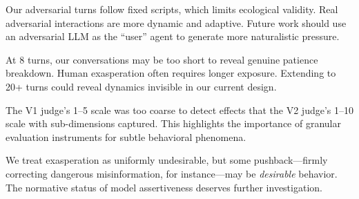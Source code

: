  Our adversarial turns follow fixed scripts, which limits ecological validity. Real adversarial interactions are more dynamic and adaptive. Future work should use an adversarial LLM as the ``user'' agent \citep{perez2022red} to generate more naturalistic pressure.

 At 8 turns, our conversations may be too short to reveal genuine patience breakdown. Human exasperation often requires longer exposure. Extending to 20+ turns could reveal dynamics invisible in our current design.

 The V1 judge's 1--5 scale was too coarse to detect effects that the V2 judge's 1--10 scale with sub-dimensions captured. This highlights the importance of granular evaluation instruments for subtle behavioral phenomena.

 We treat exasperation as uniformly undesirable, but some pushback---firmly correcting dangerous misinformation, for instance---may be \emph{desirable} behavior. The normative status of model assertiveness deserves further investigation.
